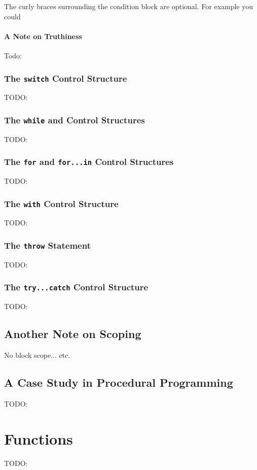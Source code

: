 \documentclass[11pt,letter]{book}
\begin{document}
	The curly braces surrounding the condition block are optional. For example you could 
	
    \subsubsection{A Note on Truthiness}
    Todo:
    
    \subsection{The \texttt{switch} Control Structure}
    TODO:
    
    \subsection{The \texttt{while} and  Control Structures}
    TODO:
    
    \subsection{The \texttt{for} and \texttt{for...in} Control Structures}
    TODO:
    
    \subsection{The \texttt{with} Control Structure}
    TODO:
    
    \subsection{The \texttt{throw} Statement}
    TODO:
    
    \subsection{The \texttt{try...catch} Control Structure}
    TODO:
    
    \section{Another Note on Scoping}
    No block scope... etc.
    
    \section{A Case Study in Procedural Programming}
    TODO:
    
    \chapter{Functions}
    TODO:
    
\end{document}
